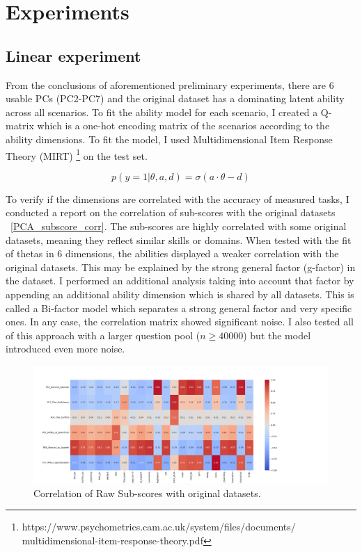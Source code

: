 \section{Experiments}
\subsection{Linear experiment}
From the conclusions of aforementioned preliminary experiments, there are 6 usable PCs (PC2-PC7) and the original dataset has a dominating latent ability across all scenarios. To fit the ability model for each scenario, I created a Q-matrix which is a one-hot encoding matrix of the scenarios according to the ability dimensions. To fit the model, I used Multidimensional Item Response Theory (MIRT) \footnote{https://www.psychometrics.cam.ac.uk/system/files/documents/ multidimensional-item-response-theory.pdf} on the test set.

\[
p(y=1|\theta,a,d) = \sigma(a\cdot \theta - d)
\]

To verify if the dimensions are correlated with the accuracy of measured tasks, I conducted a report on the correlation of sub-scores with the original datasets ~\ref{PCA_subscore_corr}. The sub-scores are highly correlated with some original datasets, meaning they reflect similar skills or domains. When tested with the fit of thetas in 6 dimensions, the abilities displayed a weaker correlation with the original datasets. This may be explained by the strong general factor (g-factor) in the dataset. I performed an additional analysis taking into account that factor by appending an additional ability dimension which is shared by all datasets. This is called a Bi-factor model which separates a strong general factor and very specific ones. In any case, the correlation matrix showed significant noise. I also tested all of this approach with a larger question pool ($n\ge 40000$) but the model introduced even more noise.

\begin{figure}[!t]
    \centering
    \includegraphics[width=\linewidth]{figures/PCA_subscore_corr.png}
    \caption{Correlation of Raw Sub-scores with original datasets.}
    \label{fig:PCA_subscore_corr}
\end{figure}

